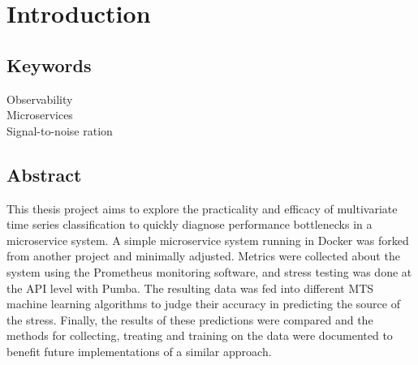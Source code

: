 
\chapter{Introduction} %

\label{Chapter1} %


\newcommand{\keyword}[1]{\textbf{#1}}
\newcommand{\tabhead}[1]{\textbf{#1}}
\newcommand{\code}[1]{\texttt{#1}}
\newcommand{\file}[1]{\texttt{\bfseries#1}}
\newcommand{\option}[1]{\texttt{\itshape#1}}


\section{Keywords}

Observability \\
Microservices \\
Signal-to-noise ration \\

\section{Abstract}
This thesis project aims to explore the practicality and efficacy of multivariate time series classification to quickly diagnose performance bottlenecks in a microservice system.
A simple microservice system running in Docker was forked from another project and minimally adjusted. Metrics were collected about the system using the Prometheus monitoring software, and stress testing was done at the API level with Pumba. 
The resulting data was fed into different MTS machine learning algorithms to judge their accuracy in predicting the source of the stress.
Finally, the results of these predictions were compared and the methods for collecting, treating and training on the data were documented to benefit future implementations of a similar approach.


